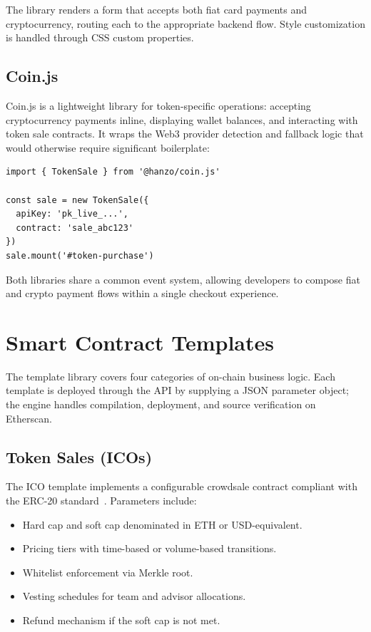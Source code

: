 \documentclass[11pt,letterpaper]{article}
\begin{document}
The library renders a form that accepts both fiat card payments and
cryptocurrency, routing each to the appropriate backend flow.  Style
customization is handled through CSS custom properties.

\subsection{Coin.js}

Coin.js is a lightweight library for token-specific operations: accepting
cryptocurrency payments inline, displaying wallet balances, and interacting
with token sale contracts.  It wraps the Web3 provider detection and fallback
logic that would otherwise require significant boilerplate:

\begin{verbatim}
import { TokenSale } from '@hanzo/coin.js'

const sale = new TokenSale({
  apiKey: 'pk_live_...',
  contract: 'sale_abc123'
})
sale.mount('#token-purchase')
\end{verbatim}

Both libraries share a common event system, allowing developers to compose
fiat and crypto payment flows within a single checkout experience.

\section{Smart Contract Templates}
\label{sec:templates}

The template library covers four categories of on-chain business logic.  Each
template is deployed through the API by supplying a JSON parameter object; the
engine handles compilation, deployment, and source verification on Etherscan.

\subsection{Token Sales (ICOs)}

The ICO template implements a configurable crowdsale contract compliant with
the ERC-20 standard~\cite{vogelsteller2015}.  Parameters include:

\begin{itemize}[leftmargin=1.1em]
    \item Hard cap and soft cap denominated in ETH or USD-equivalent.
    \item Pricing tiers with time-based or volume-based transitions.
    \item Whitelist enforcement via Merkle root.
    \item Vesting schedules for team and advisor allocations.
    \item Refund mechanism if the soft cap is not met.
\end{itemize}
\end{document}

